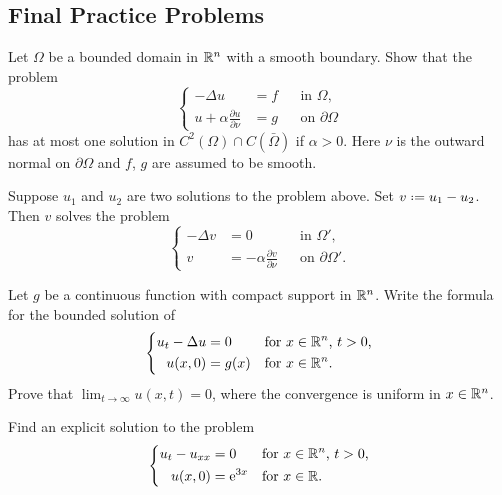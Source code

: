 \subsection{Final Practice Problems}
\begin{problem}
  Let \(\Omega\) be a bounded domain in \(\mathbb{R}^n\) with a smooth
  boundary. Show that the problem
  \[
    \left\{
      \begin{aligned}
        -\Delta u&=f&&\text{in \(\Omega\),}\\
        u+\alpha\frac{\partial u}{\partial\nu}&=g&&\text{on \(\partial\Omega\)}
      \end{aligned}
    \right.
  \]
  has at most one solution in \(C^2(\Omega)\cap C(\bar\Omega)\) if
  \(\alpha>0\). Here \(\nu\) is the outward normal on \(\partial\Omega\)
  and \(f\), \(g\) are assumed to be smooth.
\end{problem}
\begin{solution*}
  Suppose \(u_1\) and \(u_2\) are two solutions to the problem
  above. Set \(v\defeq u_1-u_2\). Then \(v\) solves the problem
  \[
    \left\{
      \begin{aligned}
        -\Delta v&=0&&\text{in \(\Omega'\),}\\
        v&=-\alpha\frac{\partial v}{\partial\nu}&&\text{on \(\partial\Omega'\).}
      \end{aligned}
    \right.
  \]
\end{solution*}

\begin{problem}
  Let \(g\) be a continuous function with compact support in
  \(\mathbb{R}^n\). Write the formula for the bounded solution of
  \[
    \left\{
      \begin{aligned}
        u_t-\Delta u&=0&&\text{for \(x\in\mathbb{R}^n\), \(t>0\),}\\
        u(x,0)&=g(x)&&\text{for \(x\in\mathbb{R}^n\).}
      \end{aligned}
    \right.
  \]
  Prove that \(\lim_{t\to\infty} u(x,t)=0\), where the convergence is
  uniform in \(x\in\mathbb{R}^n\).
\end{problem}
\begin{solution*}
\end{solution*}

\begin{problem}
  Find an explicit solution to the problem
  \[
    \left\{
      \begin{aligned}
        u_t-u_{xx}&=0&&\text{for \(x\in\mathbb{R}^n\), \(t>0\),}\\
        u(x,0)&=\mathrm{e}^{3x}&&\text{for \(x\in\mathbb{R}\).}
      \end{aligned}
    \right.
  \]
\end{problem}
\begin{solution*}
\end{solution*}

